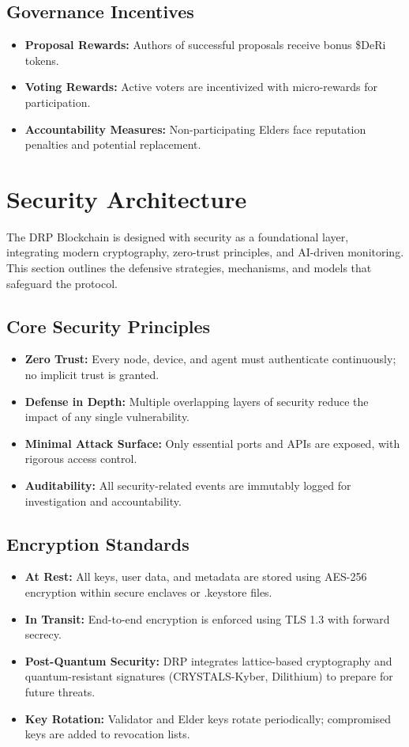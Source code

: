 \documentclass[11pt,a4paper]{article}
\begin{document}
\subsection{Governance Incentives}
\begin{itemize}
    \item \textbf{Proposal Rewards:} Authors of successful proposals receive bonus \$DeRi tokens.  
    \item \textbf{Voting Rewards:} Active voters are incentivized with micro-rewards for participation.  
    \item \textbf{Accountability Measures:} Non-participating Elders face reputation penalties and potential replacement.  
\end{itemize}

\section{Security Architecture}

The DRP Blockchain is designed with security as a foundational layer, integrating modern cryptography, zero-trust principles, and AI-driven monitoring. This section outlines the defensive strategies, mechanisms, and models that safeguard the protocol.

\subsection{Core Security Principles}
\begin{itemize}
    \item \textbf{Zero Trust:} Every node, device, and agent must authenticate continuously; no implicit trust is granted.  
    \item \textbf{Defense in Depth:} Multiple overlapping layers of security reduce the impact of any single vulnerability.  
    \item \textbf{Minimal Attack Surface:} Only essential ports and APIs are exposed, with rigorous access control.  
    \item \textbf{Auditability:} All security-related events are immutably logged for investigation and accountability.  
\end{itemize}

\subsection{Encryption Standards}
\begin{itemize}
    \item \textbf{At Rest:} All keys, user data, and metadata are stored using AES-256 encryption within secure enclaves or .keystore files.  
    \item \textbf{In Transit:} End-to-end encryption is enforced using TLS 1.3 with forward secrecy.  
    \item \textbf{Post-Quantum Security:} DRP integrates lattice-based cryptography and quantum-resistant signatures (CRYSTALS-Kyber, Dilithium) to prepare for future threats.  
    \item \textbf{Key Rotation:} Validator and Elder keys rotate periodically; compromised keys are added to revocation lists.  
\end{itemize}
\end{document}
